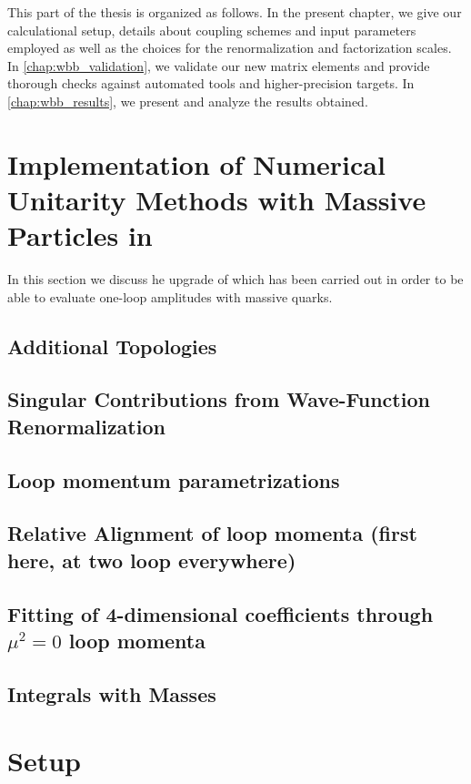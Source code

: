 This part of the thesis is organized as follows. In the present chapter, we give
our calculational setup, details about coupling
schemes and input parameters employed as well as the choices for the renormalization and
factorization scales. In
\cref{chap:wbb_validation}, we validate our new matrix elements
and provide thorough checks against automated tools and
higher-precision targets. In \cref{chap:wbb_results}, we
present and analyze the results obtained.



\section{Implementation of Numerical Unitarity Methods with Massive Particles in \BlackHat{}}
\label{sec:BHMassiveImpl}
In this section we discuss he upgrade of \BlackHat{} which has been carried out in order to be able
to evaluate one-loop amplitudes with massive quarks.

\subsection{Additional Topologies}
\subsection{Singular Contributions from Wave-Function Renormalization}
\subsection{Loop momentum parametrizations}
\subsection{Relative Alignment of loop momenta (first here, at two loop everywhere)}
\subsection{Fitting of 4-dimensional coefficients through $\mu^2=0$ loop momenta}
\subsection{Integrals with Masses}



\section{Setup}

